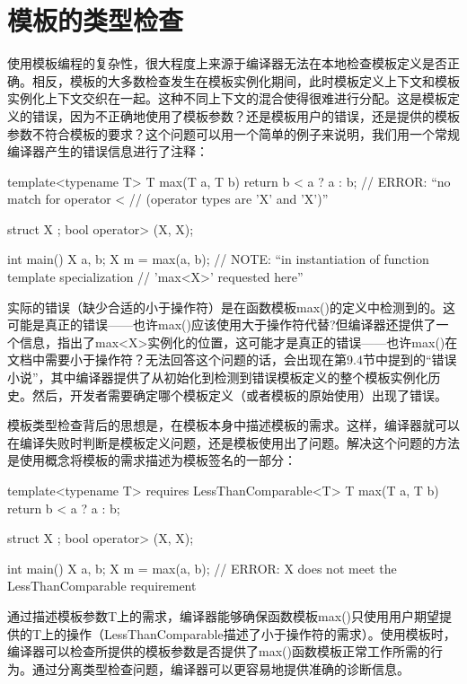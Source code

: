 \section{模板的类型检查}

使用模板编程的复杂性，很大程度上来源于编译器无法在本地检查模板定义是否正确。相反，模板的大多数检查发生在模板实例化期间，此时模板定义上下文和模板实例化上下文交织在一起。这种不同上下文的混合使得很难进行分配。这是模板定义的错误，因为不正确地使用了模板参数？还是模板用户的错误，还是提供的模板参数不符合模板的要求？这个问题可以用一个简单的例子来说明，我们用一个常规编译器产生的错误信息进行了注释：

\begin{cpp}
template<typename T>
T max(T a, T b) {
	return b < a ? a : b; // ERROR: “no match for operator <
	// (operator types are 'X' and 'X')”
}

struct X {};
bool operator> (X, X);

int main() {
	X a, b;
	X m = max(a, b); // NOTE: “in instantiation of function template specialization
					// 'max<X>' requested here”
}
\end{cpp}

实际的错误（缺少合适的小于操作符）是在函数模板max()的定义中检测到的。这可能是真正的错误——也许max()应该使用大于操作符代替?但编译器还提供了一个信息，指出了max<X>实例化的位置，这可能才是真正的错误——也许max()在文档中需要小于操作符？无法回答这个问题的话，会出现在第9.4节中提到的“错误小说”，其中编译器提供了从初始化到检测到错误模板定义的整个模板实例化历史。然后，开发者需要确定哪个模板定义（或者模板的原始使用）出现了错误。

模板类型检查背后的思想是，在模板本身中描述模板的需求。这样，编译器就可以在编译失败时判断是模板定义问题，还是模板使用出了问题。解决这个问题的方法是使用概念将模板的需求描述为模板签名的一部分：

\begin{cpp}
template<typename T> requires LessThanComparable<T>
T max(T a, T b) {
	return b < a ? a : b;
}

struct X { };
bool operator> (X, X);

int main() {
	X a, b;
	X m = max(a, b); // ERROR: X does not meet the LessThanComparable requirement
}
\end{cpp}

通过描述模板参数T上的需求，编译器能够确保函数模板max()只使用用户期望提供的T上的操作（LessThanComparable描述了小于操作符的需求）。使用模板时，编译器可以检查所提供的模板参数是否提供了max()函数模板正常工作所需的行为。通过分离类型检查问题，编译器可以更容易地提供准确的诊断信息。

